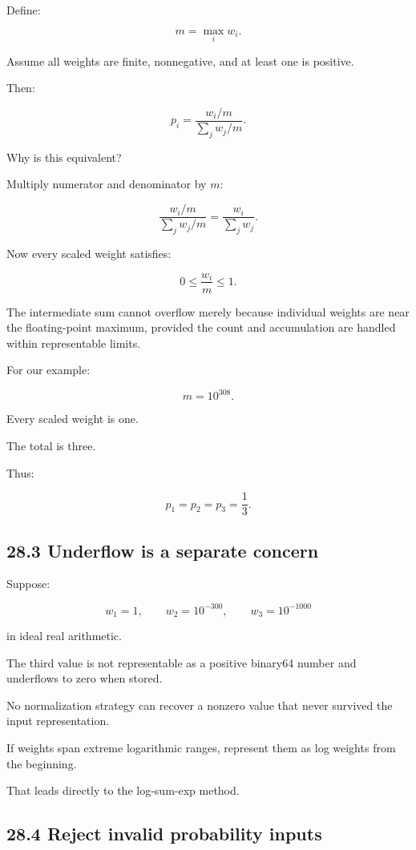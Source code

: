 Define:

\[ \boxed{ m=\max_iw_i }. \]

Assume all weights are finite, nonnegative, and at least one is positive.

Then:

\[ p_i= \frac{w_i/m}{\sum_jw_j/m}. \]

Why is this equivalent?

Multiply numerator and denominator by \(m\):

\[ \frac{w_i/m}{\sum_jw_j/m} = \frac{w_i}{\sum_jw_j}. \]

Now every scaled weight satisfies:

\[ 0\le\frac{w_i}{m}\le1. \]

The intermediate sum cannot overflow merely because individual weights are near the floating-point maximum, provided the count and accumulation are handled within representable limits.

For our example:

\[ m=10^{308}. \]

Every scaled weight is one.

The total is three.

Thus:

\[ \boxed{ p_1=p_2=p_3=\frac13 }. \]

\subsection{28.3 Underflow is a separate concern}\label{02-foundations-ii-ch031-underflow-is-a-separate-concern}

\hypertarget{02-foundations-ii-ch031-underflow-is-a-separate-concern}{}

Suppose:

\[ w_1=1, \qquad w_2=10^{-300}, \qquad w_3=10^{-1000} \]

in ideal real arithmetic.

The third value is not representable as a positive binary64 number and underflows to zero when stored.

No normalization strategy can recover a nonzero value that never survived the input representation.

If weights span extreme logarithmic ranges, represent them as log weights from the beginning.

That leads directly to the log-sum-exp method.

\subsection{28.4 Reject invalid probability inputs}\label{02-foundations-ii-ch031-reject-invalid-probability-inputs}

